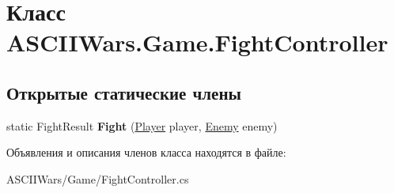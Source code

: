 \hypertarget{class_a_s_c_i_i_wars_1_1_game_1_1_fight_controller}{}\section{Класс A\+S\+C\+I\+I\+Wars.\+Game.\+Fight\+Controller}
\label{class_a_s_c_i_i_wars_1_1_game_1_1_fight_controller}
\subsection*{Открытые статические члены}
\begin{DoxyCompactItemize}
\item 
\hypertarget{class_a_s_c_i_i_wars_1_1_game_1_1_fight_controller_a9c168181e851d6ee67ac6d27ca73089a}{}\label{class_a_s_c_i_i_wars_1_1_game_1_1_fight_controller_a9c168181e851d6ee67ac6d27ca73089a} 
static Fight\+Result {\bfseries Fight} (\hyperlink{class_a_s_c_i_i_wars_1_1_game_1_1_player}{Player} player, \hyperlink{class_a_s_c_i_i_wars_1_1_game_1_1_enemy}{Enemy} enemy)
\end{DoxyCompactItemize}


Объявления и описания членов класса находятся в файле\+:\begin{DoxyCompactItemize}
\item 
A\+S\+C\+I\+I\+Wars/\+Game/Fight\+Controller.\+cs\end{DoxyCompactItemize}
